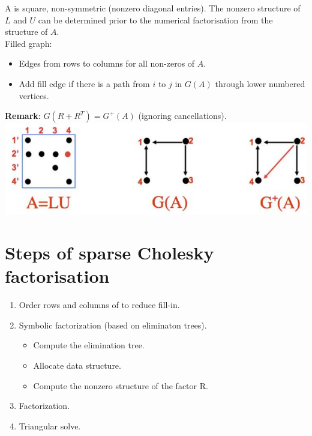 \documentclass[11pt]{book}
\begin{document}
A is square, non-symmetric (nonzero diagonal entries). The nonzero structure of $L$ and $U$ can be determined prior to the numerical factorisation from the structure of $A$.\\
Filled graph:
\begin{itemize}
    \item Edges from rows to columns for all non-zeros of $A$.
    \item Add fill edge if there is a path from $i$ to $j$ in $G(A)$ through lower numbered vertices.
\end{itemize}
\textbf{Remark}: $G\left(R+R^T\right)=G^{+}(A)$ (ignoring cancellations).\\
\includegraphics[max width=\textwidth, center]{2023_09_05_b72ccc85584d9dc6fb5cg-229}



\section*{Steps of sparse Cholesky factorisation}
\begin{enumerate}
    \item Order rows and columns of to reduce fill-in.
    \item Symbolic factorization (based on eliminaton trees).
    \begin{itemize}
        \item Compute the elimination tree.
        \item Allocate data structure. 
        \item Compute the nonzero structure of the factor R.
    \end{itemize}
    \item Factorization. 
    \item Triangular solve.
\end{enumerate}
\end{document}
